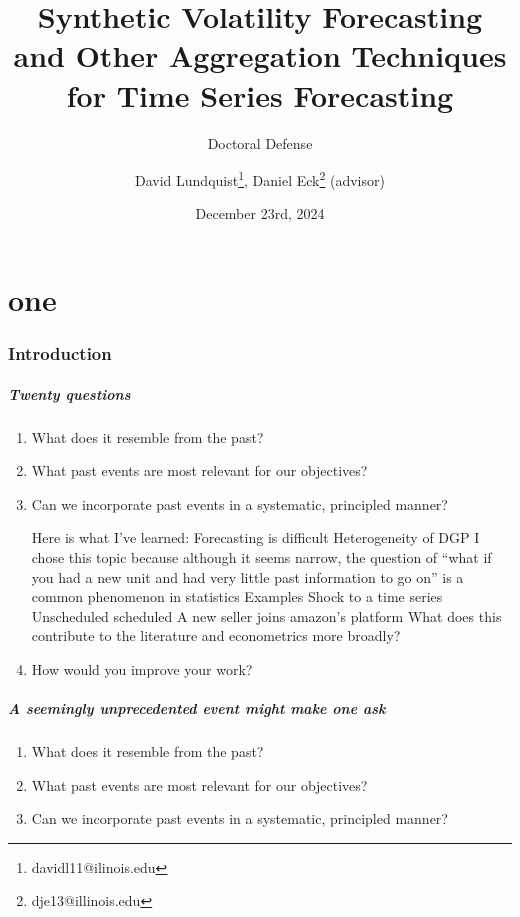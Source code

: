 \documentclass[9pt]{beamer}
\title{Synthetic Volatility Forecasting and Other Aggregation Techniques for Time Series Forecasting}
\subtitle{Doctoral Defense}
\author{David Lundquist\thanks{davidl11@ilinois.edu}, Daniel Eck\thanks{dje13@illinois.edu} (advisor)}
\date{December 23rd, 2024}
\theoremstyle{definition}
\begin{document}
\part{one}
\begin{frame}
\titlepage
\end{frame}

\section{Introduction}

\begin{frame}
    \frametitle{Twenty questions}
    \begin{enumerate}
        \item <1-> What does it resemble from the past?
        \item <2-> What past events are most relevant for our objectives?
        \item <3-> Can we incorporate past events in a systematic, principled manner?
        
        Here is what I’ve learned:
        Forecasting is difficult
        Heterogeneity of DGP
        I chose this topic because although it seems narrow, the question of “what if you had a new unit and had very little past information to go on” is a common phenomenon in statistics
        Examples
        Shock to a time series
        Unscheduled
        scheduled
        A new seller joins amazon’s platform
        What does this contribute to the literature and econometrics more broadly?
        \item <20-> How would you improve your work?
 
    \end{enumerate}
    \end{frame}

\begin{frame}
\frametitle{A seemingly unprecedented event might make one ask}
\begin{enumerate}
    \item <1-> What does it resemble from the past?
    \item <2-> What past events are most relevant for our objectives?
    \item <3-> Can we incorporate past events in a systematic, principled manner?
\end{enumerate}
\end{frame}
\end{document}
